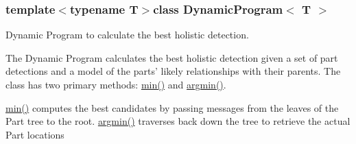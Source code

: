 \subsubsection*{template$<$typename T$>$class Dynamic\-Program$<$ T $>$}

\-Dynamic \-Program to calculate the best holistic detection. 

\-The \-Dynamic \-Program calculates the best holistic detection given a set of part detections and a model of the parts' likely relationships with their parents. \-The class has two primary methods\-: \hyperlink{classDynamicProgram_ad4f899b21d3423b4fc52ef4fb77cdd86}{min()} and \hyperlink{classDynamicProgram_a7f3276a0014489972129ad7c4a8d4a69}{argmin()}.

\hyperlink{classDynamicProgram_ad4f899b21d3423b4fc52ef4fb77cdd86}{min()} computes the best candidates by passing messages from the leaves of the \-Part tree to the root. \hyperlink{classDynamicProgram_a7f3276a0014489972129ad7c4a8d4a69}{argmin()} traverses back down the tree to retrieve the actual \-Part locations 

